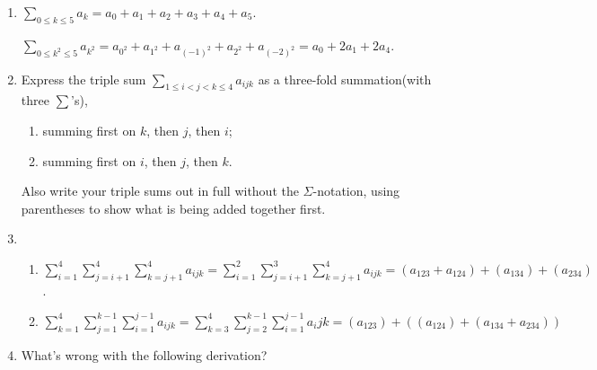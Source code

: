 \documentclass[12pt,a4paper]{article}
\makeatletter
\newtheorem*{solution}{Solution}
\theoremstyle{definition}
\renewenvironment{solution}[1][Solution] {\par\pushQED{\qed}\normalfont\topsep6\p@\@plus6\p@\relax\trivlist\item[\hskip\labelsep\bfseries#1\@addpunct{.}]\ignorespaces}{\popQED\endtrivlist\@endpefalse} \makeatother
\makeatother
\begin{document}
\begin{enumerate}
\begin{solution}
        	$\sum_{0\le k\le 5} a_k=a_0+a_1+a_2+a_3+a_4+a_5$.
        	
        	$\sum_{0\le k^2\le5}a_{k^2}=a_{0^2}+a_{1^2}+a_{(-1)^2}+a_{2^2}+a_{(-2)^2}=a_0+2a_1+2a_4$.
        	
        \end{solution}
    \item 
        Express the triple sum $\sum_{1 \le i < j < k \le 4}a_{ijk}$ as a three-fold summation(with three $\sum$'s),
        \begin{enumerate}
        	\item
        	    summing first on $k$, then $j$, then $i$;
        	\item 
        	    summing first on $i$, then $j$, then $k$.
        \end{enumerate}
        Also write your triple sums out in full without the $\Sigma$-notation, using parentheses to show what is being added together first.
        \begin{solution}
        	\quad\\
        	\begin{enumerate}
        		\item 
        		    $\sum_{i=1}^{4}\sum_{j=i+1}^{4}\sum_{k=j+1}^{4}a_{ijk}=\sum_{i=1}^{2}\sum_{j=i+1}^{3}\sum_{k=j+1}^4a_{ijk}=(a_{123}+a_{124})+(a_{134})+(a_{234})$.
        		\item 
        		    $\sum_{k=1}^4\sum_{j=1}^{k-1}\sum_{i=1}^{j-1}a_{ijk}=\sum_{k=3}^4\sum_{j=2}^{k-1}\sum_{i=1}^{j-1}a_ijk=(a_{123})+((a_{124})+(a_{134}+a_{234}))$
        	\end{enumerate}
        \end{solution}
    \item 
        What's wrong with the following derivation?
        

\end{enumerate}
\end{document}
